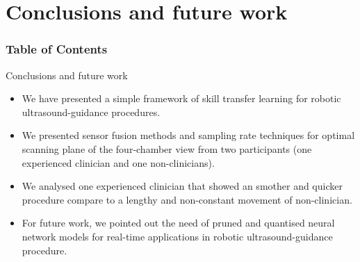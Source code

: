 \section{Conclusions and future work}
\begin{frame}
      \frametitle{Table of Contents}
      \tableofcontents[currentsection]
  \end{frame}


{


\begin{frame}{Conclusions and future work}

\begin{itemize}
\item We have presented a simple framework of skill transfer learning for robotic ultrasound-guidance procedures.
\item We presented sensor fusion methods and sampling rate techniques for optimal scanning plane of the four-chamber
view from two participants (one experienced clinician and one non-clinicians).
\item We analysed one experienced clinician that showed an smother and quicker procedure compare
to a lengthy and non-constant movement of non-clinician.
\item For future work, we pointed out the need of pruned and quantised neural network models
for real-time applications in robotic ultrasound-guidance procedure.
\end{itemize}

\end{frame}
}


